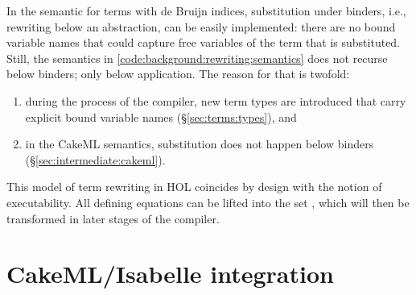 In the semantic for terms with de Bruijn indices, substitution under binders, i.e., rewriting below an abstraction, can be easily implemented: there are no bound variable names that could capture free variables of the term that is substituted.
Still, the semantics in \cref{code:background:rewriting:semantics} does not recurse below binders; only below application.
The reason for that is twofold:
\begin{enumerate}
  \item during the process of the compiler, new term types are introduced that carry explicit bound variable names (§\ref{sec:terms:types}), and
  \item in the CakeML semantics, substitution does not happen below binders (§\ref{sec:intermediate:cakeml}).
\end{enumerate}

\noindent
This model of term rewriting in HOL coincides by design with the notion of executability.
All defining equations can be lifted into the set \R, which will then be transformed in later stages of the compiler.

\section{CakeML/Isabelle integration}
\label{sec:background:cakeml}

